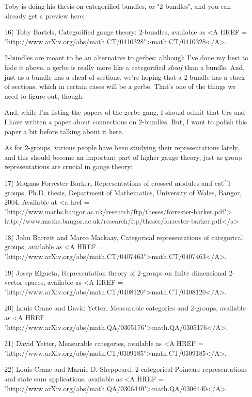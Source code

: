 Toby is doing his thesis on categorified bundles, or "2-bundles", and
you can already get a preview here:

16) Toby Bartels, Categorified gauge theory: 2-bundles, available as
<A HREF = "http://www.arXiv.org/abs/math.CT/0410328">math.CT/0410328</A>.

2-bundles are meant to be an alternative to gerbes: although I've done
my best to hide it above, a gerbe is really more like a categorified
\emph{sheaf} than a bundle.  And, just as a bundle has a sheaf of
sections, we're hoping that a 2-bundle has a stack of sections, which
in certain cases will be a gerbe.  That's one of the things we need to
figure out, though.

And, while I'm listing the papers of the gerbe gang, I should admit that 
Urs and I have written a paper about connections on 2-bundles.  But, I
want to polish this paper a bit before talking about it here.

As for 2-groups, various people have been studying their representations
lately, and this should become an important part of higher gauge theory, 
just as group representations are crucial in gauge theory:

17) Magnus Forrester-Barker, Representations of crossed modules and 
cat^{1}-groups, Ph.D. thesis, Department of Mathematics, University of
Wales, Bangor, 2004.  Available at 
<a href = "http://www.maths.bangor.ac.uk/research/ftp/theses/forrester-barker.pdf">
http://www.maths.bangor.ac.uk/research/ftp/theses/forrester-barker.pdf</a>

18) John Barrett and Marco Mackaay, Categorical representations of 
categorical groups, available as <A HREF = "http://www.arXiv.org/abs/math.CT/0407463">math.CT/0407463</A>.

19) Josep Elgueta, Representation theory of 2-groups on finite dimensional
2-vector spaces, available as <A HREF = "http://www.arXiv.org/abs/math.CT/0408120">math.CT/0408120</A>.
 
20) Louis Crane and David Yetter, Measurable categories and 2-groups,
available as 
<A HREF = "http://www.arXiv.org/abs/math.QA/0305176">math.QA/0305176</A>.

21) David Yetter, Measurable categories, 
available as
<A HREF = "http://www.arXiv.org/abs/math.CT/0309185">math.CT/0309185</A>.

22) Louis Crane and Marnie D. Sheppeard, 2-categorical Poincare
representations and state sum applications, available as
<A HREF = "http://www.arXiv.org/abs/math.QA/0306440">math.QA/0306440</A>.

